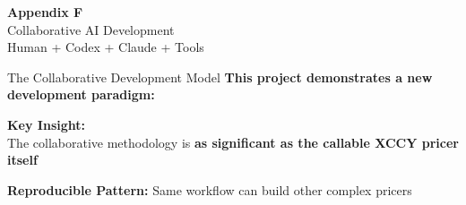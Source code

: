 \documentclass[aspectratio=169,11pt]{beamer}
\begin{document}
\begin{frame}{}
\begin{center}
\Huge\textbf{Appendix F}\\[1cm]
\Large Collaborative AI Development\\[0.5cm]
\normalsize Human + Codex + Claude + Tools
\end{center}
\end{frame}


\begin{frame}{The Collaborative Development Model}
\textbf{This project demonstrates a new development paradigm:}

\begin{center}
\end{center}

\vspace{0.5cm}
\textbf{Key Insight:}\\
The collaborative methodology is \textbf{as significant as the callable XCCY pricer itself}

\textbf{Reproducible Pattern:} Same workflow can build other complex pricers
\end{frame}
\end{document}
